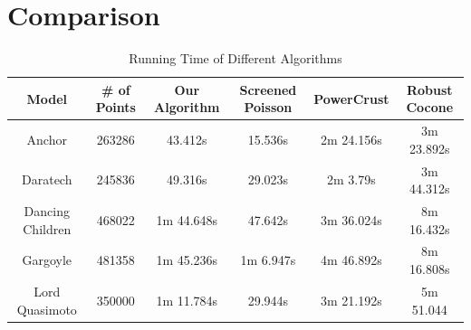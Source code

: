 \documentclass[preprint,5p,times,twocolumn]{elsarticle}
\begin{document}
\section{Comparison}
\begin{table}[h!]
	\centering
	\begin{tabular}{||c|c|cccc||} 
		\hline
		Model & \# of Points & Our Algorithm & Screened Poisson & PowerCrust & Robust Cocone \\
		\hline\hline                                                          
		Anchor & 263286 & 43.412s & 15.536s & 2m 24.156s  & 3m 23.892s\\
		Daratech & 245836 & 49.316s & 29.023s & 2m 3.79s  & 3m 44.312s\\ 
		Dancing Children & 468022 & 1m 44.648s & 47.642s & 3m 36.024s  & 8m 16.432s\\ 
		Gargoyle & 481358 & 1m 45.236s & 1m 6.947s & 4m 46.892s & 8m 16.808s\\ 
		Lord Quasimoto & 350000 & 1m 11.784s & 29.944s & 3m 21.192s  & 5m 51.044\\
		\hline
	\end{tabular}
	\caption{Running Time of Different Algorithms}
	\label{table:1}
\end{table}


\newpage
\end{document}

